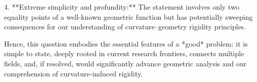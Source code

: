 4. **Extreme simplicity and profundity:** The statement involves only two equality points of a well-known geometric function but has potentially sweeping consequences for our understanding of curvature–geometry rigidity principles.

Hence, this question embodies the essential features of a *good* problem: it is simple to state, deeply rooted in current research frontiers, connects multiple fields, and, if resolved, would significantly advance geometric analysis and our comprehension of curvature-induced rigidity.
